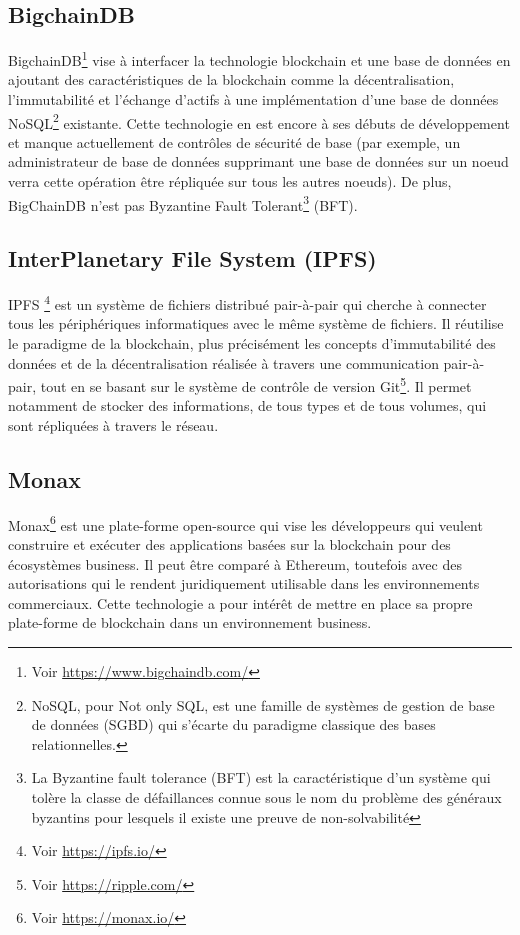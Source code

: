 \documentclass{tnreport}
\begin{document}
\subsection{BigchainDB}

BigchainDB\footnote{Voir \url{https://www.bigchaindb.com/}} vise à interfacer la technologie blockchain et une base de données en ajoutant des caractéristiques de la blockchain comme la décentralisation, l'immutabilité et l'échange d'actifs à une implémentation d'une base de données NoSQL\footnote{NoSQL, pour Not only SQL, est une famille de systèmes de gestion de base de données (SGBD) qui s'écarte du paradigme classique des bases relationnelles.} existante. Cette technologie en est encore à ses débuts de développement et manque actuellement de contrôles de sécurité de base (par exemple, un administrateur de base de données supprimant une base de données sur un noeud verra cette opération être répliquée sur tous les autres noeuds). De plus, BigChainDB n'est pas Byzantine Fault Tolerant\footnote{	La Byzantine fault tolerance (BFT) est la caractéristique d'un système qui tolère la classe de défaillances connue sous le nom du problème des généraux byzantins pour lesquels il existe une preuve de non-solvabilité} (BFT).

\subsection{InterPlanetary File System (IPFS)}

IPFS \footnote{Voir \url{https://ipfs.io/}} est un système de fichiers distribué pair-à-pair qui cherche à connecter tous les périphériques informatiques avec le même système de fichiers. Il réutilise le paradigme de la blockchain, plus précisément les concepts d'immutabilité des données et de la décentralisation réalisée à travers une communication pair-à-pair, tout en se basant sur le système de contrôle de version Git\footnote{Voir \url{https://ripple.com/}}. Il permet notamment de stocker des informations, de tous types et de tous volumes, qui sont répliquées à travers le réseau. 

\subsection{Monax}

Monax\footnote{Voir \url{https://monax.io/}} est une plate-forme open-source qui vise les développeurs qui veulent construire et exécuter des applications basées sur la blockchain pour des écosystèmes business. Il peut être comparé à Ethereum, toutefois avec des autorisations qui le rendent juridiquement utilisable dans les environnements commerciaux. Cette technologie a pour intérêt de mettre en place sa propre plate-forme de blockchain dans un environnement business.
\end{document}

